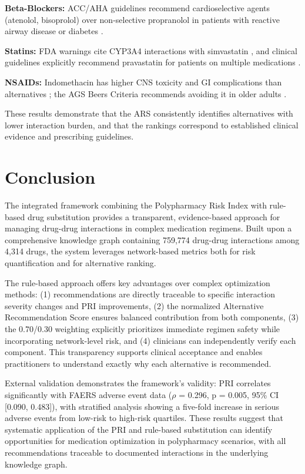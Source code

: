 \documentclass[11pt,a4paper]{article}
\begin{document}
\textbf{Beta-Blockers:} ACC/AHA guidelines recommend cardioselective agents (atenolol, bisoprolol) over non-selective propranolol in patients with reactive airway disease or diabetes \cite{whelton2018acc}.

\textbf{Statins:} FDA warnings cite CYP3A4 interactions with simvastatin \cite{fda2011statin}, and clinical guidelines explicitly recommend pravastatin for patients on multiple medications \cite{grundy2019acc}.

\textbf{NSAIDs:} Indomethacin has higher CNS toxicity and GI complications than alternatives \cite{henry1996nsaid}; the AGS Beers Criteria recommends avoiding it in older adults \cite{agscriteria2019}.

These results demonstrate that the ARS consistently identifies alternatives with lower interaction burden, and that the rankings correspond to established clinical evidence and prescribing guidelines.

\section{Conclusion}

The integrated framework combining the Polypharmacy Risk Index with rule-based drug substitution provides a transparent, evidence-based approach for managing drug-drug interactions in complex medication regimens. Built upon a comprehensive knowledge graph containing 759,774 drug-drug interactions among 4,314 drugs, the system leverages network-based metrics both for risk quantification and for alternative ranking.

The rule-based approach offers key advantages over complex optimization methods: (1) recommendations are directly traceable to specific interaction severity changes and PRI improvements, (2) the normalized Alternative Recommendation Score ensures balanced contribution from both components, (3) the 0.70/0.30 weighting explicitly prioritizes immediate regimen safety while incorporating network-level risk, and (4) clinicians can independently verify each component. This transparency supports clinical acceptance and enables practitioners to understand exactly why each alternative is recommended.

External validation demonstrates the framework's validity: PRI correlates significantly with FAERS adverse event data ($\rho$ = 0.296, p = 0.005, 95\% CI [0.090, 0.483]), with stratified analysis showing a five-fold increase in serious adverse events from low-risk to high-risk quartiles. These results suggest that systematic application of the PRI and rule-based substitution can identify opportunities for medication optimization in polypharmacy scenarios, with all recommendations traceable to documented interactions in the underlying knowledge graph.
\end{document}

